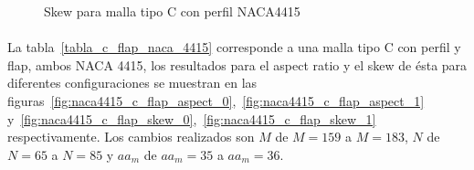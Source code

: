 \documentclass[letterpaper, openright, 12pt]{book}
\begin{document}
\begin{figure}[H]

        \caption[Skew para malla tipo C con perfil NACA4415]{Skew para malla
          tipo C con perfil NACA4415}
        \label{fig:naca4415_c_skew_1}
    \end{figure}

    \paragraph*{}
    La tabla~\ref{tabla_c_flap_naca_4415} corresponde a una malla tipo C con
    perfil y flap, ambos NACA 4415, los resultados para el aspect ratio y el skew de
    ésta para diferentes configuraciones se muestran en las
    figuras~\ref{fig:naca4415_c_flap_aspect_0},~\ref{fig:naca4415_c_flap_aspect_1}
    y~\ref{fig:naca4415_c_flap_skew_0},~\ref{fig:naca4415_c_flap_skew_1} respectivamente.
    Los cambios realizados son $M$ de $M=159$ a $M=183$, $N$ de $N=65$ a $N=85$
    y $aa_{m}$ de $aa_{m} = 35$ a $aa_{m}=36$.
\end{document}
